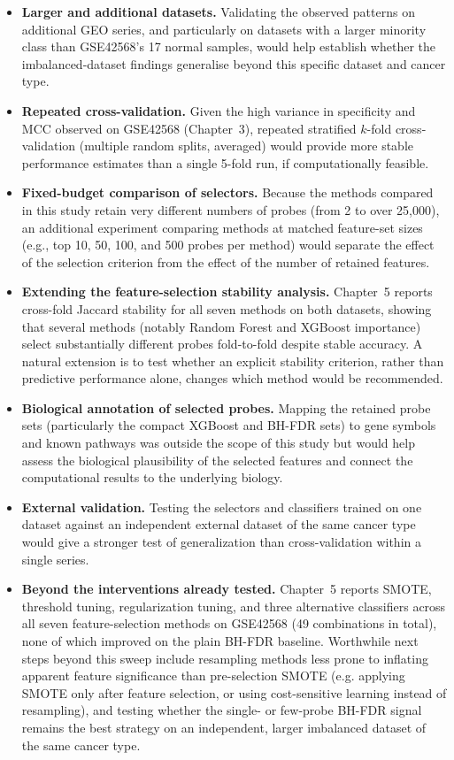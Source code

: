 \begin{itemize}
    \item \textbf{Larger and additional datasets.} Validating the observed patterns on additional GEO series, and particularly on datasets with a larger minority class than GSE42568's 17 normal samples, would help establish whether the imbalanced-dataset findings generalise beyond this specific dataset and cancer type.
    \item \textbf{Repeated cross-validation.} Given the high variance in specificity and MCC observed on GSE42568 (Chapter~3), repeated stratified $k$-fold cross-validation (multiple random splits, averaged) would provide more stable performance estimates than a single 5-fold run, if computationally feasible.
    \item \textbf{Fixed-budget comparison of selectors.} Because the methods compared in this study retain very different numbers of probes (from 2 to over 25,000), an additional experiment comparing methods at matched feature-set sizes (e.g., top 10, 50, 100, and 500 probes per method) would separate the effect of the selection criterion from the effect of the number of retained features.
    \item \textbf{Extending the feature-selection stability analysis.} Chapter~5 reports cross-fold Jaccard stability for all seven methods on both datasets, showing that several methods (notably Random Forest and XGBoost importance) select substantially different probes fold-to-fold despite stable accuracy. A natural extension is to test whether an explicit stability criterion, rather than predictive performance alone, changes which method would be recommended.
    \item \textbf{Biological annotation of selected probes.} Mapping the retained probe sets (particularly the compact XGBoost and BH-FDR sets) to gene symbols and known pathways was outside the scope of this study but would help assess the biological plausibility of the selected features and connect the computational results to the underlying biology.
    \item \textbf{External validation.} Testing the selectors and classifiers trained on one dataset against an independent external dataset of the same cancer type would give a stronger test of generalization than cross-validation within a single series.
    \item \textbf{Beyond the interventions already tested.} Chapter~5 reports SMOTE, threshold tuning, regularization tuning, and three alternative classifiers across all seven feature-selection methods on GSE42568 (49 combinations in total), none of which improved on the plain BH-FDR baseline. Worthwhile next steps beyond this sweep include resampling methods less prone to inflating apparent feature significance than pre-selection SMOTE (e.g. applying SMOTE only after feature selection, or using cost-sensitive learning instead of resampling), and testing whether the single- or few-probe BH-FDR signal remains the best strategy on an independent, larger imbalanced dataset of the same cancer type.
\end{itemize}
